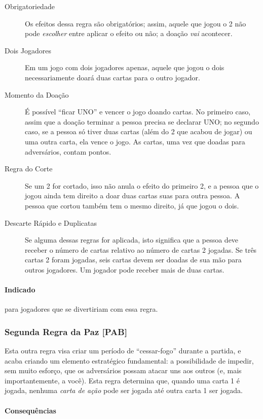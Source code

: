 \begin{description}
\item[Obrigatoriedade]{Os efeitos dessa regra são obrigatórios; assim, aquele que jogou o 2 não pode \emph{escolher} entre aplicar o efeito ou não; a doação \emph{vai} acontecer.}
\item[Dois Jogadores]{Em um jogo com dois jogadores apenas, aquele que jogou o dois necessariamente doará duas cartas para o outro jogador.}
\item[Momento da Doação]{É possível ``ficar UNO'' e vencer o jogo doando cartas. No primeiro caso, assim que a doação terminar a pessoa precisa se declarar UNO; no segundo caso, se a pessoa só tiver duas cartas (além do 2 que acabou de jogar) ou uma outra carta, ela vence o jogo. As cartas, uma vez que doadas para adversários, contam pontos.}
\item[Regra do Corte]{Se um 2 for cortado, isso não anula o efeito do primeiro 2, e a pessoa que o jogou ainda tem direito a doar duas cartas suas para outra pessoa. A pessoa que cortou também tem o mesmo direito, já que jogou o dois.}
\item[Descarte Rápido e Duplicatas]{Se alguma dessas regras for aplicada, isto significa que a pessoa deve receber o número de cartas relativo ao número de cartas 2 jogadas. Se três cartas 2 foram jogadas, seis cartas devem ser doadas de sua mão para outros jogadores. Um jogador pode receber mais de duas cartas.}
\end{description}

\paragraph{Indicado}

para jogadores que se divertiriam com essa regra.

\subsubsection{Segunda Regra da Paz [PAB]}

Esta outra regra visa criar um período de ``cessar-fogo'' durante a partida, e acaba criando um elemento estratégico fundamental: a possibilidade de impedir, sem muito esforço, que os adversários possam atacar uns aos outros (e, mais importantemente, a você). Esta regra determina que, quando uma carta 1 é jogada, nenhuma \emph{carta de ação} pode ser jogada até outra carta 1 ser jogada.

\paragraph{Consequências}

